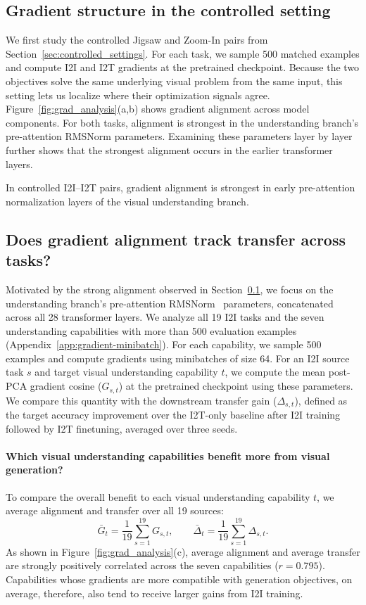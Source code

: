 \subsection{Gradient structure in the controlled setting}
\label{sec:gradient-controlled}
We first study the controlled Jigsaw and Zoom-In pairs from Section~\ref{sec:controlled_settings}.
For each task, we sample 500 matched examples and compute I2I and I2T gradients at the pretrained checkpoint.
Because the two objectives solve the same underlying visual problem from the same input, this setting lets us localize where their optimization signals agree.
Figure~\ref{fig:grad_analysis}(a,b) shows gradient alignment across model components.
For both tasks, alignment is strongest in the understanding branch's pre-attention RMSNorm parameters.
Examining these parameters layer by layer further shows that the strongest alignment occurs in the earlier transformer layers.
\begin{findingbox}
In controlled I2I--I2T pairs, gradient alignment is strongest in early pre-attention normalization layers of the visual understanding branch.
\end{findingbox}
\subsection{Does gradient alignment track transfer across tasks?}
Motivated by the strong alignment observed in Section~\ref{sec:gradient-controlled}, we focus on the understanding branch's pre-attention RMSNorm~\citep{zhang2019rootrmsnorm} parameters, concatenated across all 28 transformer layers.
We analyze all 19 I2I tasks and the seven understanding capabilities with more than 500 evaluation examples (Appendix~\ref{app:gradient-minibatch}).
For each capability, we sample 500 examples and compute gradients using minibatches of size 64.
For an I2I source task $s$ and target visual understanding capability $t$, we compute the mean post-PCA gradient cosine ($G_{s,t}$) at the pretrained checkpoint using these parameters.
We compare this quantity with the downstream transfer gain
($\Delta_{s,t}$), defined as the target accuracy improvement over the I2T-only baseline after I2I training followed by I2T finetuning, averaged over three seeds.
\paragraph{Which visual understanding capabilities benefit more from visual generation?}
To compare the overall benefit to each visual understanding capability \(t\), we average alignment and transfer over all 19 sources:
\[
\bar{G}_t=\frac{1}{19}\sum_{s=1}^{19}G_{s,t},
\qquad
\bar{\Delta}_t=\frac{1}{19}\sum_{s=1}^{19}\Delta_{s,t}.
\]
As shown in Figure~\ref{fig:grad_analysis}(c), average alignment and average transfer are strongly positively correlated across the seven capabilities ($r=0.795$).
Capabilities whose gradients are more compatible with generation objectives, on average, therefore, also tend to receive larger gains from I2I training.
